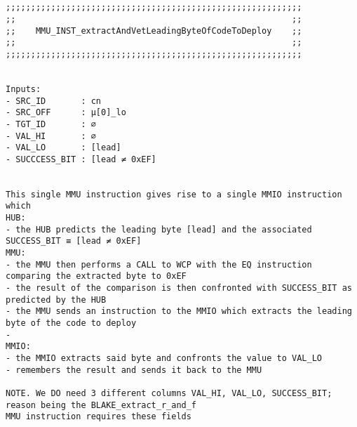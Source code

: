 \documentclass[varwidth=\maxdimen,margin=0.5cm,multi={verbatim}]{standalone}
\begin{document}
\begin{verbatim}


;;;;;;;;;;;;;;;;;;;;;;;;;;;;;;;;;;;;;;;;;;;;;;;;;;;;;;;;;;;
;;                                                       ;;
;;    MMU_INST_extractAndVetLeadingByteOfCodeToDeploy    ;;
;;                                                       ;;
;;;;;;;;;;;;;;;;;;;;;;;;;;;;;;;;;;;;;;;;;;;;;;;;;;;;;;;;;;;


Inputs:
- SRC_ID       : cn
- SRC_OFF      : µ[0]_lo
- TGT_ID       : ∅
- VAL_HI       : ∅
- VAL_LO       : [lead]
- SUCCCESS_BIT : [lead ≠ 0xEF]


This single MMU instruction gives rise to a single MMIO instruction which
HUB:
- the HUB predicts the leading byte [lead] and the associated SUCCESS_BIT ≡ [lead ≠ 0xEF]
MMU:
- the MMU then performs a CALL to WCP with the EQ instruction comparing the extracted byte to 0xEF
- the result of the comparison is then confronted with SUCCESS_BIT as predicted by the HUB 
- the MMU sends an instruction to the MMIO which extracts the leading byte of the code to deploy
- 
MMIO:
- the MMIO extracts said byte and confronts the value to VAL_LO
- remembers the result and sends it back to the MMU

NOTE. We DO need 3 different columns VAL_HI, VAL_LO, SUCCESS_BIT; reason being the BLAKE_extract_r_and_f
MMU instruction requires these fields
\end{verbatim}
\end{document}
